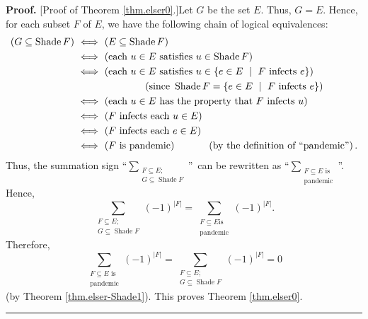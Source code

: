 \documentclass[numbers=enddot,12pt,final,onecolumn]{scrartcl}%
\theoremstyle{definition}
\newenvironment{proof}[1][Proof]{\noindent\textbf{#1.} }{\ \rule{0.5em}{0.5em}}
\let\sumnonlimits\sum
\renewcommand{\sum}{\sumnonlimits\limits}
\newenvironment{verlong}{}{}
\begin{document}
\begin{verlong}
\begin{proof}
[Proof of Theorem \ref{thm.elser0}.]Let $G$ be the set $E$. Thus, $G=E$.
Hence, for each subset $F$ of $E$, we have the following chain of logical
equivalences:%
\begin{align*}
\left(  G\subseteq\operatorname*{Shade}F\right)  \  &  \Longleftrightarrow
\ \left(  E\subseteq\operatorname*{Shade}F\right) \\
&  \Longleftrightarrow\ \left(  \text{each }u\in E\text{ satisfies }%
u\in\operatorname*{Shade}F\right) \\
&  \Longleftrightarrow\ \left(  \text{each }u\in E\text{ satisfies }%
u\in\left\{  e\in E\ \mid\ F\text{ infects }e\right\}  \right) \\
&  \ \ \ \ \ \ \ \ \ \ \ \ \ \ \ \ \ \ \ \ \left(  \text{since }%
\operatorname*{Shade}F=\left\{  e\in E\ \mid\ F\text{ infects }e\right\}
\right) \\
&  \Longleftrightarrow\ \left(  \text{each }u\in E\text{ has the property that
}F\text{ infects }u\right) \\
&  \Longleftrightarrow\ \left(  F\text{ infects each }u\in E\right) \\
&  \Longleftrightarrow\ \left(  F\text{ infects each }e\in E\right) \\
&  \Longleftrightarrow\ \left(  F\text{ is pandemic}\right)
\ \ \ \ \ \ \ \ \ \ \left(  \text{by the definition of \textquotedblleft
pandemic\textquotedblright}\right)  .
\end{align*}
Thus, the summation sign \textquotedblleft$\sum_{\substack{F\subseteq
E;\\G\subseteq\operatorname*{Shade}F}}$\textquotedblright\ can be rewritten as
\textquotedblleft$\sum_{\substack{F\subseteq E\text{ is}\\\text{pandemic}}%
}$\textquotedblright. Hence,%
\[
\sum_{\substack{F\subseteq E;\\G\subseteq\operatorname*{Shade}F}}\left(
-1\right)  ^{\left\vert F\right\vert }=\sum_{\substack{F\subseteq E\text{
is}\\\text{pandemic}}}\left(  -1\right)  ^{\left\vert F\right\vert }.
\]
Therefore,%
\[
\sum_{\substack{F\subseteq E\text{ is}\\\text{pandemic}}}\left(  -1\right)
^{\left\vert F\right\vert }=\sum_{\substack{F\subseteq E;\\G\subseteq
\operatorname*{Shade}F}}\left(  -1\right)  ^{\left\vert F\right\vert }=0
\]
(by Theorem \ref{thm.elser-Shade1}). This proves Theorem \ref{thm.elser0}.
\end{proof}
\end{verlong}
\end{document}
